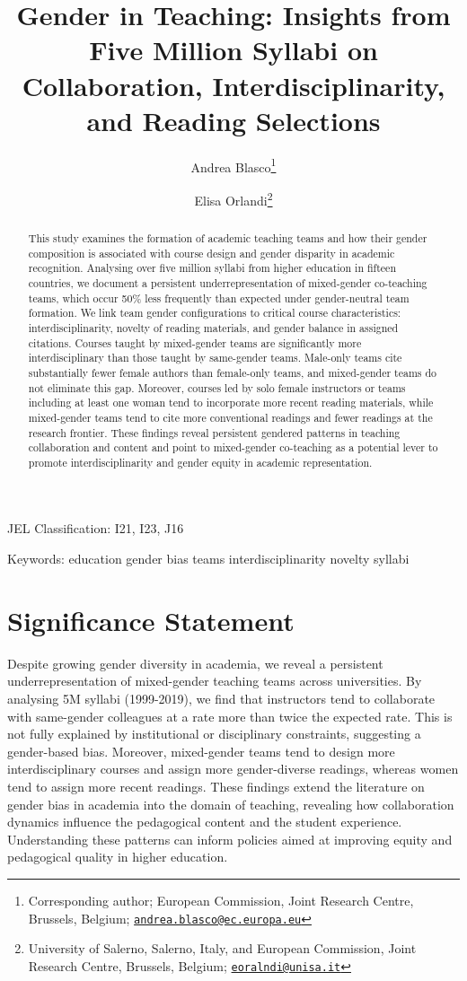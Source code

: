 \documentclass[
  11pt,
]{article}
\title{Gender in Teaching:
Insights from Five Million Syllabi on Collaboration, Interdisciplinarity, and Reading Selections}
\author{Andrea Blasco\footnote{Corresponding author; European Commission, Joint Research Centre, Brussels, Belgium; \href{mailto:andrea.blasco@ec.europa.eu}{\nolinkurl{andrea.blasco@ec.europa.eu}}} \and Elisa Orlandi\footnote{University of Salerno, Salerno, Italy, and European Commission, Joint Research Centre, Brussels, Belgium; \href{mailto:eoralndi@unisa.it}{\nolinkurl{eoralndi@unisa.it}}}}
\date{}
\begin{document}
\maketitle
\begin{abstract}
This study examines the formation of academic teaching teams and how their gender composition is associated with course design and gender disparity in academic recognition. Analysing over five million syllabi from higher education in fifteen countries, we document a persistent underrepresentation of mixed-gender co-teaching teams, which occur 50\% less frequently than expected under gender-neutral team formation. We link team gender configurations to critical course characteristics: interdisciplinarity, novelty of reading materials, and gender balance in assigned citations. Courses taught by mixed-gender teams are significantly more interdisciplinary than those taught by same-gender teams. Male-only teams cite substantially fewer female authors than female-only teams, and mixed-gender teams do not eliminate this gap. Moreover, courses led by solo female instructors or teams including at least one woman tend to incorporate more recent reading materials, while mixed-gender teams tend to cite more conventional readings and fewer readings at the research frontier. These findings reveal persistent gendered patterns in teaching collaboration and content and point to mixed-gender co-teaching as a potential lever to promote interdisciplinarity and gender equity in academic representation.
\end{abstract}

JEL Classification: I21, I23, J16

Keywords: education \textbar{} gender bias \textbar{} teams \textbar{} interdisciplinarity \textbar{} novelty \textbar{} syllabi

\newpage

\section*{Significance Statement}\label{significance-statement}

Despite growing gender diversity in academia, we reveal a persistent underrepresentation of mixed-gender teaching teams across universities. By analysing 5M syllabi (1999-2019), we find that instructors tend to collaborate with same-gender colleagues at a rate more than twice the expected rate. This is not fully explained by institutional or disciplinary constraints, suggesting a gender-based bias. Moreover, mixed-gender teams tend to design more interdisciplinary courses and assign more gender-diverse readings, whereas women tend to assign more recent readings. These findings extend the literature on gender bias in academia into the domain of teaching, revealing how collaboration dynamics influence the pedagogical content and the student experience. Understanding these patterns can inform policies aimed at improving equity and pedagogical quality in higher education.
\end{document}
